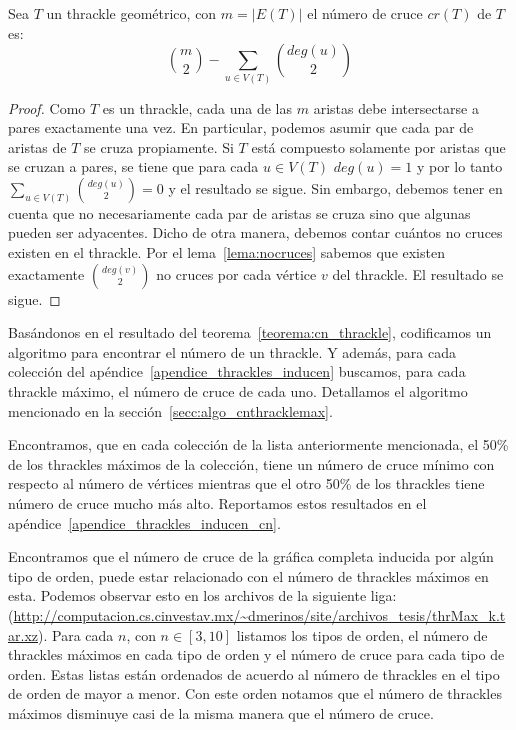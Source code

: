     \begin{theorem} \label{teorema:cn_thrackle}
      Sea $T$ un thrackle geométrico, con $m=|E({T})|$ el número de cruce $cr({T})$ de ${T}$ es:
      \[
        \binom{m}{2} - \sum_{u \in V({T})} \binom{deg(u)}{2}
      \]
    \end{theorem}
    \begin{proof}
      Como $T$ es un thrackle, cada una de las $m$ aristas debe intersectarse a pares
      exactamente una vez. En particular, podemos asumir que cada par de aristas de ${T}$ se
      cruza propiamente. Si ${T}$ está compuesto solamente por aristas que se cruzan a pares,
      se tiene que para cada $u\in V({T})$ $deg(u)=1$ y por lo tanto $\sum_{u \in V({T})}
      \binom{deg(u)}{2} = 0$ y el resultado se sigue. Sin embargo, debemos tener en cuenta
      que no necesariamente cada par de aristas se cruza sino que algunas pueden ser
      adyacentes. Dicho de otra manera, debemos contar cuántos no cruces existen en el
      thrackle. Por el lema~\ref{lema:nocruces} sabemos que existen exactamente
      $\binom{deg(v)}{2}$ no cruces por cada vértice $v$ del thrackle. El resultado se sigue.
    \end{proof}

    Basándonos en el resultado del teorema~\ref{teorema:cn_thrackle}, codificamos un
    algoritmo para encontrar el número de un thrackle. Y además, para cada colección del
    apéndice~\ref{apendice_thrackles_inducen} buscamos, para cada thrackle máximo, el número
    de cruce de cada uno. Detallamos el algoritmo mencionado en la
    sección~\ref{secc:algo_cnthracklemax}.

    Encontramos, que en cada colección de la lista anteriormente mencionada, el 50\% de los
    thrackles máximos de la colección, tiene un número de cruce mínimo con respecto al número
    de vértices mientras que el otro 50\% de los thrackles tiene número de cruce mucho más
    alto. Reportamos estos resultados en el apéndice~\ref{apendice_thrackles_inducen_cn}.

    Encontramos que el número de cruce de la gráfica completa inducida por algún tipo de orden, puede estar
    relacionado con el número de thrackles máximos en esta. Podemos observar esto en los archivos de la
    siguiente liga:
    (\url{http://computacion.cs.cinvestav.mx/~dmerinos/site/archivos_tesis/thrMax_k.tar.xz}). Para cada $n$,
    con $n \in [3,10]$ listamos los tipos de orden, el número de thrackles máximos en cada tipo de orden y
    el número de cruce para cada tipo de orden. Estas listas están ordenados de acuerdo al número de
    thrackles en el tipo de orden de mayor a menor. Con este orden notamos que el número de thrackles
    máximos disminuye casi de la misma manera que el número de cruce.

